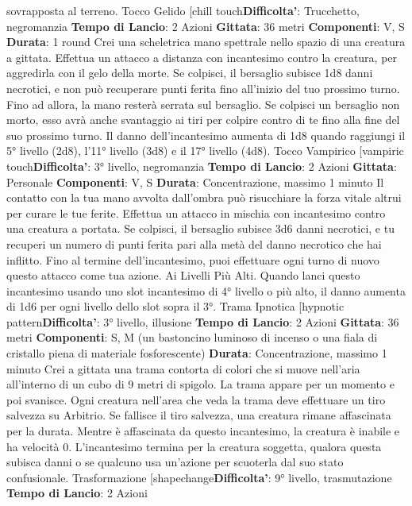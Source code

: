 \begin{multicols}{2}
sovrapposta al terreno.
Tocco Gelido
[chill touch\textbf{Difficolta'}:
Trucchetto, negromanzia
\textbf{Tempo di Lancio}: 2 Azioni
\textbf{Gittata}: 36 metri
\textbf{Componenti}: V, S
\textbf{Durata}: 1 round
Crei una scheletrica mano spettrale nello spazio di una
creatura a gittata. Effettua un attacco a distanza con
incantesimo contro la creatura, per aggredirla con il
gelo della morte. Se colpisci, il bersaglio subisce 1d8
danni necrotici, e non può recuperare punti ferita fino
all’inizio del tuo prossimo turno. Fino ad allora, la mano
resterà serrata sul bersaglio.
Se colpisci un bersaglio non morto, esso avrà anche
svantaggio ai tiri per colpire contro di te fino alla fine del
suo prossimo turno.
Il danno dell’incantesimo aumenta di 1d8 quando
raggiungi il 5° livello (2d8), l’11° livello (3d8) e il 17°
livello (4d8).
Tocco Vampirico
[vampiric touch\textbf{Difficolta'}:
3° livello, negromanzia
\textbf{Tempo di Lancio}: 2 Azioni
\textbf{Gittata}: Personale
\textbf{Componenti}: V, S
\textbf{Durata}: Concentrazione, massimo 1 minuto
Il contatto con la tua mano avvolta dall’ombra può
risucchiare la forza vitale altrui per curare le tue ferite.
Effettua un attacco in mischia con incantesimo contro
una creatura a portata. Se colpisci, il bersaglio subisce
3d6 danni necrotici, e tu recuperi un numero di punti
ferita pari alla metà del danno necrotico che hai inflitto.
Fino al termine dell’incantesimo, puoi effettuare ogni
turno di nuovo questo attacco come tua azione.
Ai Livelli Più Alti. Quando lanci questo incantesimo
usando uno slot incantesimo di 4° livello o più alto, il
danno aumenta di 1d6 per ogni livello dello slot sopra il
3°.
Trama Ipnotica
[hypnotic pattern\textbf{Difficolta'}:
3° livello, illusione
\textbf{Tempo di Lancio}: 2 Azioni
\textbf{Gittata}: 36 metri
\textbf{Componenti}: S, M (un bastoncino luminoso di incenso
o una fiala di cristallo piena di materiale fosforescente)
\textbf{Durata}: Concentrazione, massimo 1 minuto
Crei a gittata una trama contorta di colori che si muove
nell’aria all’interno di un cubo di 9 metri di spigolo. La
trama appare per un momento e poi svanisce. Ogni
creatura nell’area che veda la trama deve effettuare un
tiro salvezza su Arbitrio. Se fallisce il tiro salvezza,
una creatura rimane affascinata per la durata. Mentre è
affascinata da questo incantesimo, la creatura è inabile
e ha velocità 0.
L’incantesimo termina per la creatura soggetta, qualora
questa subisca danni o se qualcuno usa un’azione per
scuoterla dal suo stato confusionale.
Trasformazione
[shapechange\textbf{Difficolta'}:
9° livello, trasmutazione
\textbf{Tempo di Lancio}: 2 Azioni

\end{multicols}
